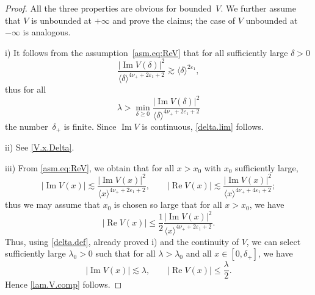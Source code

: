 \begin{proof} 
All the three properties are obvious for bounded~$V$. 
We further assume that $V$ is unbounded at $+\infty$ 
and prove the claims; 
the case of $V$ unbounded at $-\infty$ is analogous.	

i) It follows from the assumption~\eqref{asm.eq:ReV} that for all sufficiently large $\delta>0$
\begin{equation}
\frac{|{\operatorname{Im}} V(\delta)|^2}{\langle \delta \rangle^{4 \nu_+ + 2 {\varepsilon}_1+2}} 
{\gtrsim}
\langle \delta \rangle ^{2 {\varepsilon}_1},
\end{equation}
thus for all 
\begin{equation}
\lambda > \min_{\delta \geq 0 } 
\frac{|{\operatorname{Im}} V(\delta)|^2}{\langle \delta \rangle^{4 \nu_+ + 2 {\varepsilon}_1+2}}  
\end{equation}
the number~$\delta_+$ is finite. 
Since ${\operatorname{Im}} V$ is continuous, \eqref{delta.lim} follows.

ii) See \eqref{V.x.Delta}.

iii) From \eqref{asm.eq:ReV}, 
we obtain that for all $x>x_0$ with $x_0$ sufficiently large,  
\begin{equation}
|{\operatorname{Im}} V(x)| 
{\lesssim}  \frac{|{\operatorname{Im}} V(x)|^2}{\langle x\rangle ^{4 \nu_+ + 2 {\varepsilon}_1+2}},
\qquad 
|{\operatorname{Re}} V(x)| 
{\lesssim}  \frac{|{\operatorname{Im}} V(x)|^2}{\langle x\rangle^{4 \nu_+ + 4 {\varepsilon}_1+2}};
\end{equation}
thus we may assume that $x_0$ is chosen so large that for all $x>x_0$, we have 
\begin{equation}
|{\operatorname{Re}} V(x)| 
\leq  \frac 12 \frac{|{\operatorname{Im}} V(x)|^2}{\langle x\rangle^{4 \nu_+ + 2 {\varepsilon}_1+2}}.
\end{equation}
Thus, using \eqref{delta.def}, already proved i) and the continuity of $V$, we can select sufficiently large $\lambda_0>0$ such that for all $\lambda>\lambda_0$ and all $x \in [0,\delta_+]$, we have
\begin{equation}\label{lambdapul}
|{\operatorname{Im}} V(x)| 
{\lesssim}  \lambda,
\qquad 
|{\operatorname{Re}} V(x)| 
\leq  \frac \lambda 2.
\end{equation}
Hence \eqref{lam.V.comp} follows.
\end{proof}

